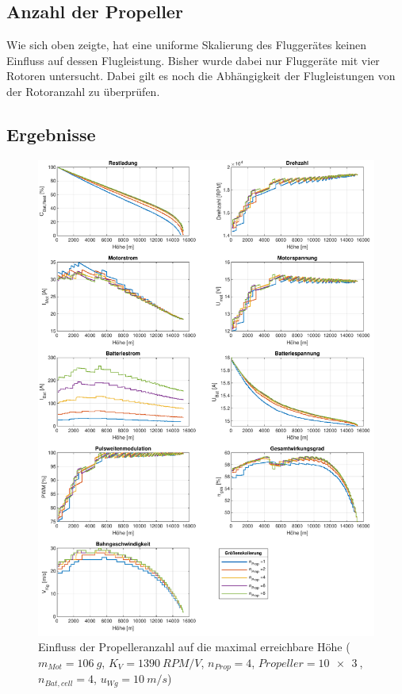 \subsection{Anzahl der Propeller}
Wie sich oben zeigte, hat eine uniforme Skalierung des Fluggerätes keinen Einfluss auf dessen Flugleistung. Bisher wurde dabei nur Fluggeräte mit vier Rotoren untersucht. Dabei gilt es noch die Abhängigkeit der Flugleistungen von der Rotoranzahl zu überprüfen. 

\subsection{Ergebnisse}
\begin{figure}[H]
	\includegraphics[scale=0.7]{Diagramme/Anz_Prop.pdf}
	\caption{Einfluss der Propelleranzahl auf die maximal erreichbare Höhe (\ensuremath{m_{Mot}=\SI{106}{g}}, \ensuremath{K_V=\SI{1390}{RPM/V}}, \ensuremath{n_{Prop}=4}, \ensuremath{Propeller=\SI{10x3}{}}, \ensuremath{n_{Bat,cell}=4}, \ensuremath{u_{Wg}=\SI{10}{m/s}})}
	\label{abb:groessenskalierung}
\end{figure}

